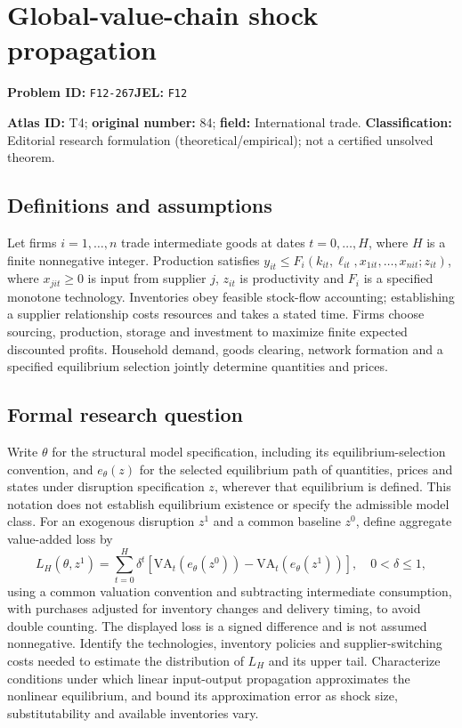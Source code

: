 \documentclass[11pt,a4paper]{article}
\begin{document}
\section*{Global-value-chain shock propagation}
\textbf{Problem ID:} \texttt{F12-267}\quad \textbf{JEL:} \texttt{F12}\par
\label{problem:OP-0084}
\label{atlas:prob:T4}

\noindent\textbf{Atlas ID:} T4; \textbf{original number:} 84; \textbf{field:} International trade. \textbf{Classification:} Editorial research formulation (theoretical/empirical); not a certified unsolved theorem.

\subsection*{Definitions and assumptions}
Let firms $i=1,\ldots,n$ trade intermediate goods at dates $t=0,\ldots,H$, where $H$ is a finite nonnegative integer. Production satisfies $y_{it}\le F_i(k_{it},\ell_{it},x_{1it},\ldots,x_{nit};z_{it})$, where $x_{jit}\ge0$ is input from supplier $j$, $z_{it}$ is productivity and $F_i$ is a specified monotone technology. Inventories obey feasible stock-flow accounting; establishing a supplier relationship costs resources and takes a stated time. Firms choose sourcing, production, storage and investment to maximize finite expected discounted profits. Household demand, goods clearing, network formation and a specified equilibrium selection jointly determine quantities and prices.

\subsection*{Formal research question}
Write $\theta$ for the structural model specification, including its equilibrium-selection convention, and $e_\theta(z)$ for the selected equilibrium path of quantities, prices and states under disruption specification $z$, wherever that equilibrium is defined. This notation does not establish equilibrium existence or specify the admissible model class. For an exogenous disruption $z^1$ and a common baseline $z^0$, define aggregate value-added loss by
\[
 L_H(\theta,z^1)=\sum_{t=0}^{H}\delta^t
 [\mathrm{VA}_t(e_\theta(z^0))-\mathrm{VA}_t(e_\theta(z^1))],\quad 0<\delta\le1,
\]
using a common valuation convention and subtracting intermediate consumption, with purchases adjusted for inventory changes and delivery timing, to avoid double counting. The displayed loss is a signed difference and is not assumed nonnegative. Identify the technologies, inventory policies and supplier-switching costs needed to estimate the distribution of $L_H$ and its upper tail. Characterize conditions under which linear input-output propagation approximates the nonlinear equilibrium, and bound its approximation error as shock size, substitutability and available inventories vary.
\end{document}

